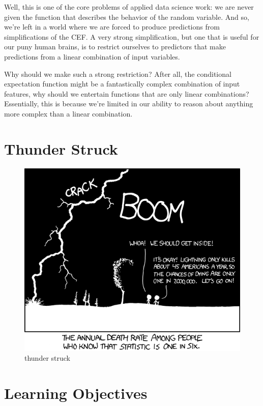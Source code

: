 \documentclass[
  letterpaper,
  DIV=11,
  numbers=noendperiod]{scrreprt}
\begin{document}
Well, this is one of the core problems of applied data science work: we
are never given the function that describes the behavior of the random
variable. And so, we're left in a world where we are forced to produce
predictions from simplifications of the CEF. A very strong
simplification, but one that is useful for our puny human brains, is to
restrict ourselves to predictors that make predictions from a linear
combination of input variables.

Why should we make such a strong restriction? After all, the conditional
expectation function might be a fantastically complex combination of
input features, why should we entertain functions that are only linear
combinations? Essentially, this is because we're limited in our ability
to reason about anything more complex than a linear combination.

\section{Thunder Struck}\label{thunder-struck}

\begin{figure}[H]

{\centering \includegraphics{./images/conditional_risk.png}

}

\caption{thunder struck}

\end{figure}%

\section{Learning Objectives}\label{learning-objectives-3}
\end{document}
